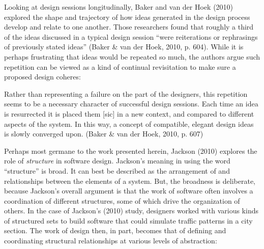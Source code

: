 Looking at design sessions longitudinally, Baker and van der Hoek (2010)
explored the shape and trajectory of how ideas generated in the design
process develop and relate to one another. Those researchers found that
roughly a third of the ideas discussed in a typical design session
``were reiterations or rephrasings of previously stated ideas'' (Baker
\& van der Hoek, 2010, p. 604). While it is perhaps frustrating that
ideas would be repeated so much, the authors argue such repetition can
be viewed as a kind of continual revisitation to make sure a proposed
design coheres:

Rather than representing a failure on the part of the designers, this
repetition seems to be a necessary character of successful design
sessions. Each time an idea is resurrected it is placed them {[}sic{]}
in a new context, and compared to different aspects of the system. In
this way, a concept of compatible, elegant design ideas is slowly
converged upon. (Baker \& van der Hoek, 2010, p. 607)

Perhaps most germane to the work presented herein, Jackson (2010)
explores the role of \emph{structure} in software design. Jackson's
meaning in using the word ``structure'' is broad. It can best be
described as the arrangement of and relationships between the elements
of a system. But, the broadness is deliberate, because Jackson's overall
argument is that the work of software often involves a coordination of
different structures, some of which drive the organization of others. In
the case of Jackson's (2010) study, designers worked with various kinds
of structured sets to build software that could simulate traffic
patterns in a city section. The work of design then, in part, becomes
that of defining and coordinating structural relationships at various
levels of abstraction:

